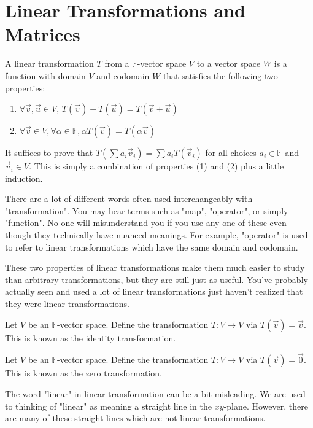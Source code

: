 \chapter{Linear Transformations and Matrices}

\begin{definition}
    A linear transformation $T$ from a $\mathbb{F}$-vector space $V$ to a vector space $W$ is a function with domain $V$ and codomain $W$ that satisfies the following two properties:
    \begin{enumerate}
        \item $\forall \vec{v},\vec{u}\in V,\, T(\vec{v})+T(\vec{u})=T(\vec{v}+\vec{u})$
        \item $\forall\vec{v}\in V,\forall \alpha\in\mathbb{F}, \alpha T(\vec{v})=T(\alpha\vec{v})$
    \end{enumerate}
    It suffices to prove that $T(\sum a_i\vec{v}_i)=\sum a_iT(\vec{v}_i)$ for all choices $a_i\in\mathbb{F}$ and $\vec{v}_i\in V$. This is simply a combination of properties (1) and (2) plus a little induction.
\end{definition}
\begin{remark}
    There are a lot of different words often used interchangeably with "transformation". You may hear terms such as "map", "operator", or simply "function". No one will misunderstand you if you use any one of these even though they technically have nuanced meanings. For example, "operator" is used to refer to linear transformations which have the same domain and codomain.
\end{remark}
These two properties of linear transformations make them much easier to study than arbitrary transformations, but they are still just as useful. You've probably actually seen and used a lot of linear transformations just haven't realized that they were linear transformations.
\begin{example}
    Let $V$ be an $\mathbb{F}$-vector space. Define the transformation $T:V\to V$ via $T(\vec{v})=\vec{v}$. This is known as the identity transformation.
\end{example}
\begin{example}
    Let $V$ be an $\mathbb{F}$-vector space. Define the transformation $T:V\to V$ via $T(\vec{v})=\vec{0}$. This is known as the zero transformation.
\end{example}
The word "linear" in linear transformation can be a bit misleading. We are used to thinking of "linear" as meaning a straight line in the $xy$-plane. However, there are many of these straight lines which are not linear transformations.
